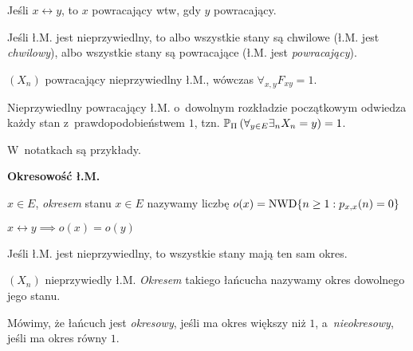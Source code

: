 



	\begin{corollary}
		Jeśli $x \leftrightarrow y$, to $x$ powracający 
		wtw, gdy $y$ powracający.
	\end{corollary}
	
	\begin{definition}
		Jeśli ł.M. jest nieprzywiedlny, to 
		albo wszystkie stany są chwilowe (ł.M. jest \emph{chwilowy}),
		albo wszystkie stany są powracające (ł.M. jest \emph{powracający}).
	\end{definition}
	
	\begin{fact}
		$(X_n)$ powracający nieprzywiedlny ł.M., 
		wówczas $\forall_{x,y} F_{xy} = 1$.
	\end{fact}
	
	\begin{corollary}
		Nieprzywiedlny powracający ł.M. 
		o~dowolnym rozkładzie początkowym 
		odwiedza każdy stan z~prawdopodobieństwem $1$,
		tzn. 
		$\P_\Pi\left( \forall_{y \in E} \exists_n X_n = y\right) = 1$.
	\end{corollary}
	
	\begin{example}
		W~notatkach są przykłady.
	\end{example}
	
	{\bf Okresowość ł.M.}
	
	\begin{definition}[okres]
		$x \in E$, \emph{okresem} stanu $x \in E$ nazywamy liczbę $o(x) = \mr{NWD} \{ n \geq 1: p_{x,x} (n) = 0 \}$
	\end{definition}
	
	\begin{fact}
		$x \leftrightarrow y \implies o(x) = o(y)$
	\end{fact}
	
	\begin{corollary}
		Jeśli ł.M. jest nieprzywiedlny, to wszystkie stany mają ten 
		sam okres.
	\end{corollary}
	
	\begin{definition}[okres]
		$(X_n)$ nieprzywiedly ł.M. \emph{Okresem} takiego łańcucha
		nazywamy okres dowolnego jego stanu.
		
		Mówimy, że łańcuch jest \emph{okresowy}, jeśli ma
		okres większy niż $1$, a~\emph{nieokresowy}, jeśli ma
		okres równy $1$.
	\end{definition}
	
